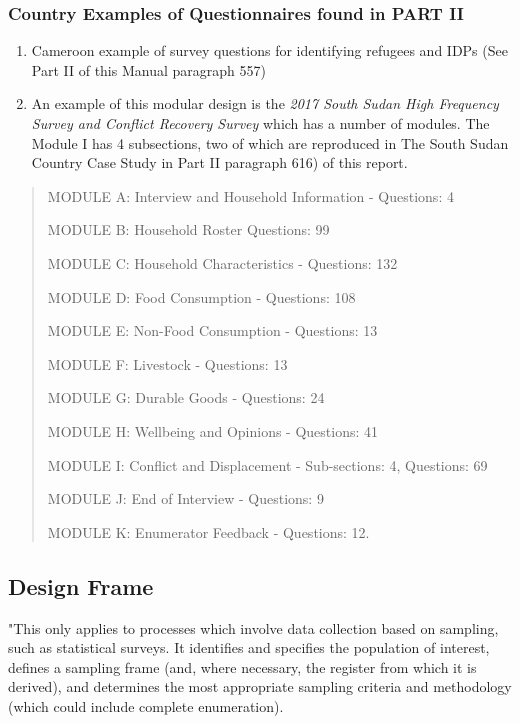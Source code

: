 \documentclass[
]{article}
\begin{document}
\hypertarget{b.3.-country-examples-of-questionnaires-found-in-part-ii}{%
\subsubsection{Country Examples of Questionnaires found in PART II}\label{b.3.-country-examples-of-questionnaires-found-in-part-ii}}

\begin{enumerate}
\def\labelenumi{\arabic{enumi}.}
\setcounter{enumi}{128}
\item
  Cameroon example of survey questions for identifying refugees and
  IDPs (See Part II of this Manual paragraph 557)
\item
  An example of this modular design is the \emph{2017 South Sudan High
  Frequency Survey and Conflict Recovery Survey} which has a number of
  modules. The Module I has 4 subsections, two of which are reproduced
  in The South Sudan Country Case Study in Part II paragraph 616) of
  this report.
\end{enumerate}

\begin{quote}
MODULE A: Interview and Household Information - Questions: 4

MODULE B: Household Roster Questions: 99

MODULE C: Household Characteristics - Questions: 132

MODULE D: Food Consumption - Questions: 108

MODULE E: Non-Food Consumption - Questions: 13

MODULE F: Livestock - Questions: 13

MODULE G: Durable Goods - Questions: 24

MODULE H: Wellbeing and Opinions - Questions: 41

MODULE I: Conflict and Displacement - Sub-sections: 4, Questions: 69

MODULE J: End of Interview - Questions: 9

MODULE K: Enumerator Feedback - Questions: 12.
\end{quote}

\hypertarget{design-frame-3}{%
\subsection{Design Frame}\label{design-frame-3}}

"This only applies to processes which involve data collection based on
sampling, such as statistical surveys. It identifies and specifies the
population of interest, defines a sampling frame (and, where necessary,
the register from which it is derived), and determines the most
appropriate sampling criteria and methodology (which could include
complete enumeration).
\end{document}
